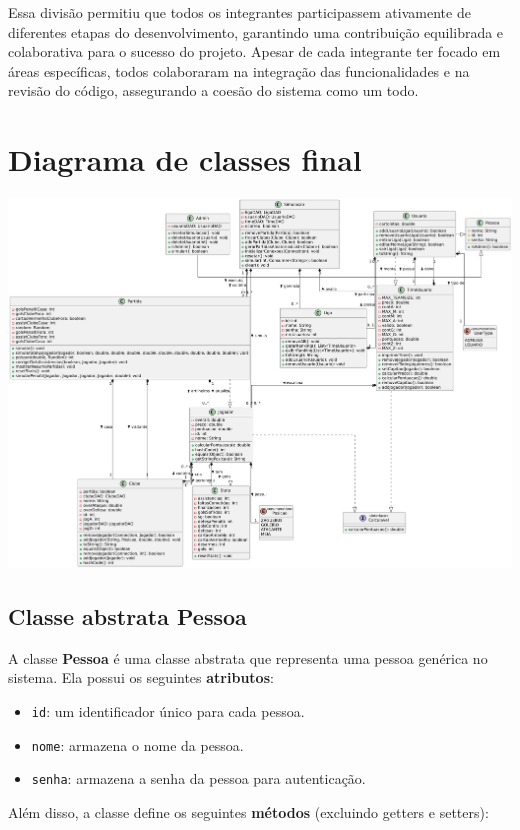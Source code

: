 \documentclass[12pt]{article}
\begin{document}
Essa divisão permitiu que todos os integrantes participassem ativamente de diferentes etapas do desenvolvimento, garantindo uma contribuição equilibrada e colaborativa para o sucesso do projeto. Apesar de cada integrante ter focado em áreas específicas, todos colaboraram na integração das funcionalidades e na revisão do código, assegurando a coesão do sistema como um todo.

\section{Diagrama de classes final}
\label{sec:classes}

\includegraphics[width=\textwidth]{Diagrama.pdf}

\subsection{Classe abstrata Pessoa}

A classe \textbf{Pessoa} é uma classe abstrata que representa uma pessoa genérica no sistema. Ela possui os seguintes \textbf{atributos}:

\begin{itemize}
  \item \texttt{id}: um identificador único para cada pessoa.
  \item \texttt{nome}: armazena o nome da pessoa.
  \item \texttt{senha}: armazena a senha da pessoa para autenticação.
\end{itemize}

Além disso, a classe define os seguintes \textbf{métodos} (excluindo getters e setters):
\end{document}
